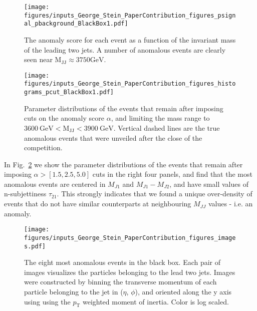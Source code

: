 \documentclass[a4paper,11pt]{article}
\begin{document}
\begin{figure}[h]
  \centering
  \texttt{[image: figures/inputs\_George\_Stein\_PaperContribution\_figures\_psignal\_pbackground\_BlackBox1.pdf]}
    \caption{The anomaly score for each event as a function of the invariant mass of the leading two jets. A number of anomalous events are clearly seen near $\mathrm{M_{JJ}\approx 3750 GeV}$.}
  \label{fig:anomaly_score}
\end{figure}

\begin{figure}[h]
  \centering

\texttt{[image: figures/inputs\_George\_Stein\_PaperContribution\_figures\_histograms\_pcut\_BlackBox1.pdf]}

  \caption{Parameter distributions of the events that remain after imposing cuts on the anomaly score $\alpha$, and limiting the mass range to  $\mathrm{3600\ GeV < M_{JJ} < 3900\ GeV}$. Vertical dashed lines are the true anomalous events that were unveiled after the close of the competition.}
  \label{fig:histograms}
\end{figure}

In Fig.~\ref{fig:histograms} we show the parameter distributions of the events that remain after imposing $\alpha > [1.5, 2.5, 5.0]$ cuts in the right four panels, and find that the most anomalous events are centered in $M_{J1}$ and $M_{J1}-M_{J2}$, and have small values of n-subjettiness $\tau_{21}$. This strongly indicates that we found a unique over-density of events that do not have similar counterparts at neighbouring $M_{JJ}$ values - i.e. an anomaly.

\begin{figure}[h]
  \centering
  \texttt{[image: figures/inputs\_George\_Stein\_PaperContribution\_figures\_images.pdf]}
    \caption{The eight most anomalous events in the black box. Each pair of images visualizes the particles belonging to the lead two jets. Images were constructed by binning the transverse momentum of each particle belonging to the jet in ($\eta$, $\phi$), and oriented along the y axis using using the $p_\text{T}$ weighted moment of inertia. Color is log scaled.}
  \label{fig:images}
\end{figure}
\end{document}
